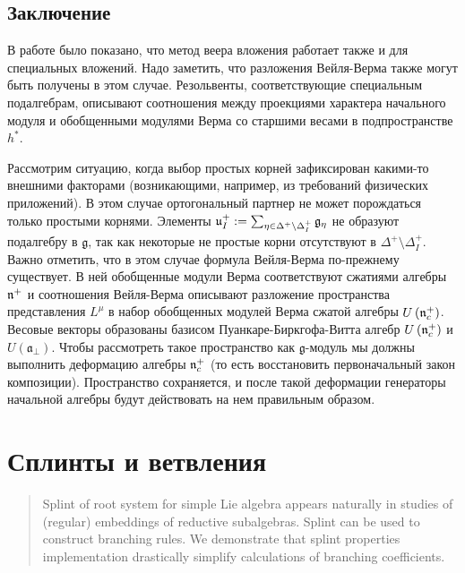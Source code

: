 \subsection{Заключение}

\label{sec:conclusions}
В работе \cite{2010arXiv1007.0318L} было показано, что метод веера вложения работает также и для специальных вложений. Надо заметить, что  разложения Вейля-Верма также могут быть получены в этом случае. Резольвенты, соответствующие специальным подалгебрам, описывают соотношения между проекциями характера начального модуля и обобщенными модулями Верма со старшими весами в подпространстве $h^*$.

Рассмотрим ситуацию, когда выбор простых корней зафиксирован какими-то внешними факторами (возникающими, например, из требований физических приложений). В этом случае ортогональный партнер не может порождаться только простыми корнями. Элементы   $\frak{u}_{I}^{+}:=\sum_{\eta \in \Delta
^{+}\setminus \Delta _{I}^{+}}\frak{g}_{\eta }$ не образуют подалгебру в  $%
\mathfrak{g}$, так как некоторые не простые корни отсутствуют в  $\Delta ^{+}\setminus
\Delta _{I}^{+}$. Важно отметить, что в этом случае формула Вейля-Верма по-прежнему существует. В ней обобщенные модули Верма соответствуют сжатиями \cite{Doebner1967Melsheimer} алгебры $%
\frak{n}^{+}$ и соотношения Вейля-Верма описывают разложение пространства представления $L^{\mu}$ в набор обобщенных модулей Верма сжатой алгебры  $U\left(\frak{n}_c^{+}\right)$. Весовые векторы образованы базисом Пуанкаре-Биркгофа-Витта алгебр $U\left(\frak{n}_c^{+}\right)$ и
$U\left( \mathfrak{a}_{\bot} \right)$. Чтобы рассмотреть такое пространство как  $%
\mathfrak{g}$-модуль мы должны выполнить деформацию \cite
{Nijenhuis1966Richardson} алгебры $\frak{n}_c^{+}$ (то есть восстановить первоначальный закон композиции). Пространство сохраняется, и после такой деформации генераторы начальной алгебры будут действовать на нем правильным образом.

\section{Сплинты и ветвления}
\label{sec:splints}


%


\begin{abstract}
Splint of root system for simple Lie algebra appears naturally in
studies of (regular) embeddings of reductive subalgebras. Splint can
be used to construct branching rules. We demonstrate that 
splint properties implementation drastically simplify calculations of
branching coefficients.
\end{abstract}

